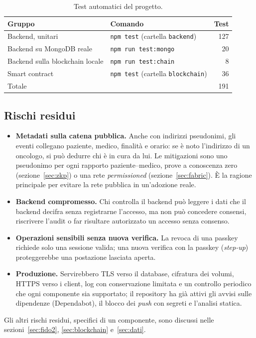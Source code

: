 \begin{table}[H]
\centering\footnotesize
\renewcommand{\arraystretch}{1.2}
\begin{tabular}{@{}p{}p{}r@{}}
\toprule
Gruppo & Comando & Test\\
\midrule
Backend, unitari & \texttt{npm test} (cartella \texttt{backend}) & 127\\
Backend su MongoDB reale & \texttt{npm run test:mongo} & 20\\
Backend sulla blockchain locale & \texttt{npm run test:chain} & 8\\
Smart contract & \texttt{npm test} (cartella \texttt{blockchain}) & 36\\
\midrule
Totale & & 191\\
\bottomrule
\end{tabular}
\caption{Test automatici del progetto.}\label{tab:test-totali}
\end{table}

\subsection{Rischi residui}\label{sec:residui}
\begin{itemize}
  \item \textbf{Metadati sulla catena pubblica.} Anche con indirizzi pseudonimi, gli eventi collegano paziente, medico, finalità e orario: se è noto l'indirizzo di un oncologo, si può dedurre chi è in cura da lui. Le mitigazioni sono uno pseudonimo per ogni rapporto paziente--medico, prove a conoscenza zero (sezione~\ref{sec:zkp}) o una rete \emph{permissioned} (sezione~\ref{sec:fabric}). È la ragione principale per evitare la rete pubblica in un'adozione reale.
  \item \textbf{Backend compromesso.} Chi controlla il backend può leggere i dati che il backend decifra senza registrarne l'accesso, ma non può concedere consensi, riscrivere l'audit o far risultare autorizzato un accesso senza consenso.
  \item \textbf{Operazioni sensibili senza nuova verifica.} La revoca di una passkey richiede solo una sessione valida; una nuova verifica con la passkey (\emph{step-up}) proteggerebbe una postazione lasciata aperta.
  \item \textbf{Produzione.} Servirebbero TLS verso il database, cifratura dei volumi, HTTPS verso i client, log con conservazione limitata e un controllo periodico che ogni componente sia supportato; il repository ha già attivi gli avvisi sulle dipendenze (Dependabot), il blocco dei \emph{push} con segreti e l'analisi statica.
\end{itemize}
Gli altri rischi residui, specifici di un componente, sono discussi nelle sezioni~\ref{sec:fido2}, \ref{sec:blockchain} e~\ref{sec:dati}.
